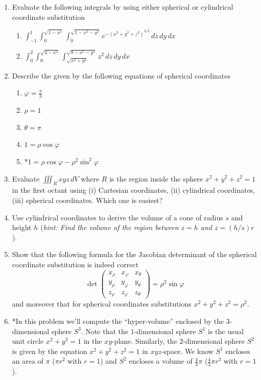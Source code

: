 \documentclass[12pt]{article}
\numberwithin{equation}{subsection}
\numberwithin{figure}{subsection}
\theoremstyle{note}
\begin{document}
{\begin{enumerate}[label=\arabic*.]
\item Evaluate the following integrals by using either spherical or cylindrical coordinate substitution

\begin{enumerate}
	\item $\displaystyle \int_{-1}^{1} \int_0^{\sqrt{1-x^2}} \int_0^{\sqrt{1-x^2-y^2}}e^{-(x^2+y^2+z^2)^{3/2}} \,dz \,dy \, dx$
	\item $\displaystyle \int_{0}^{2} \int_0^{\sqrt{4-x^2}} \int_{\sqrt{x^2+y^2}}^{\sqrt{8-x^2-y^2}} z^2 \,dz \,dy \, dx$
\end{enumerate}

\item Describe the given by the following equations of spherical coordinates

\begin{enumerate}
	\item $\varphi=\frac{\pi}{3}$
	\item $\rho=1$
	\item $\theta=\pi$
	\item $1=\rho \cos \varphi$
	\item *$1=\rho \cos \varphi - \rho^2 \sin^2 \varphi$

\end{enumerate}

\item Evaluate $\iiint_R xyz \,dV$ where $R$ is the region inside the sphere $x^2+y^2+z^2=1$ in the first octant using (i) Cartesian coordinates, (ii) cylindrical coordinates, (iii) spherical coordinates. Which one is easiest?

\item Use cylindrical coordinates to derive the volume of a cone of radius $s$ and height $h$ (\textit{hint: Find the volume of the region between $z=h$ and $z=(h/s)r$}).

\item Show that the following formula for the Jacobian determinant of the spherical coordinate substitution is indeed correct \[ \det \left( \begin{matrix} x_{\rho} & x_{\varphi} & x_{\theta} \\ y_{\rho} & y_{\varphi} & y_{\theta} \\ z_{\rho} & z_{\varphi} & z_{\theta} \end{matrix} \right)= \rho^2 \sin \varphi \]
and moreover that for spherical coordinates substitutions $x^2+y^2+z^2=\rho^2$.

\item *In this problem we'll compute the ``hyper-volume'' enclosed by the 3-dimensional sphere $S^3$. Note that the $1$-dimensional sphere $S^1$ is the usual unit circle $x^2+y^2=1$ in the $xy$-plane. Similarly, the $2$-dimensional sphere $S^2$ is given by the equation $x^2+y^2+z^2=1$ in $xyz$-space. We know $S^1$ encloses an area of $\pi$ ($\pi r^2$ with $r=1$) and $S^2$ encloses a volume of $\frac{4}{3}\pi$ ($\frac{4}{3}\pi r^3$ with $r=1$). 


\end{enumerate}}
\end{document}
